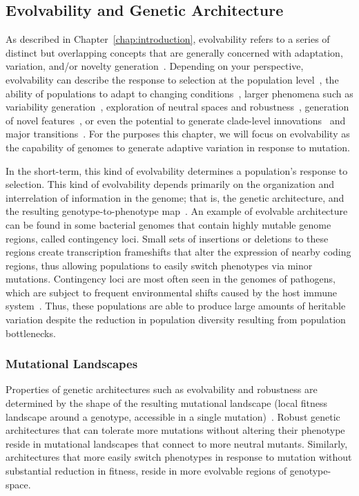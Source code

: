 \documentclass[PhD]{msu-thesis}
\begin{document}
\subsection{Evolvability and Genetic Architecture}
As described in Chapter~\ref{chap:introduction}, evolvability refers to a series of distinct but overlapping concepts that are generally concerned with adaptation, variation, and/or novelty generation~\cite{pigliucci_is_2008}. Depending on your perspective, evolvability can describe the response to selection at the population level~\cite{fisher_genetical_1930,houle_comparing_1992}, the ability of populations to adapt to changing conditions~\cite{belle_code_2002}, larger phenomena such as variability generation~\cite{gunter_p._wagner_perspective:_1996}, 
exploration of neutral spaces and robustness~\cite{andreas_wagner_robustness_2005,kitano_biological_2004}, 
generation of novel features~\cite{alberch_genes_1991,brookfield_evolution:_2001}, 
or even the potential to generate clade-level innovations~\cite{kirschner_evolvability_1998} 
and major transitions~\cite{smith_major_1995}. For the purposes this chapter, we will focus on evolvability as the capability of genomes to generate adaptive variation in response to mutation. 

In the short-term, this kind of evolvability determines a population's response to selection. This kind of evolvability depends primarily on the organization and interrelation of information in the genome; that is, the genetic architecture, and the resulting genotype-to-phenotype map~\cite{gunter_p._wagner_perspective:_1996}. An example of evolvable architecture can be found in some bacterial genomes that contain highly mutable genome regions, called contingency loci. Small sets of insertions or deletions to these regions create transcription frameshifts that alter the expression of nearby coding regions, thus allowing populations to easily switch phenotypes via minor mutations. Contingency loci are most often seen in the genomes of pathogens, which are subject to frequent environmental shifts caused by the host immune system~\cite{bayliss_simple_2001}. Thus, these populations are able to produce large amounts of heritable variation despite the reduction in population diversity resulting from population bottlenecks.


\subsubsection{Mutational Landscapes}
Properties of genetic architectures such as evolvability and robustness are determined by the shape of the resulting mutational landscape (local fitness landscape around a genotype, accessible in a single mutation)~\cite{andreas_wagner_robustness_2008}. Robust genetic architectures that can tolerate more mutations without altering their phenotype reside in mutational landscapes that connect to more neutral mutants. Similarly, architectures that more easily switch phenotypes in response to mutation without substantial reduction in fitness, reside in more evolvable regions of genotype-space.
\end{document}
